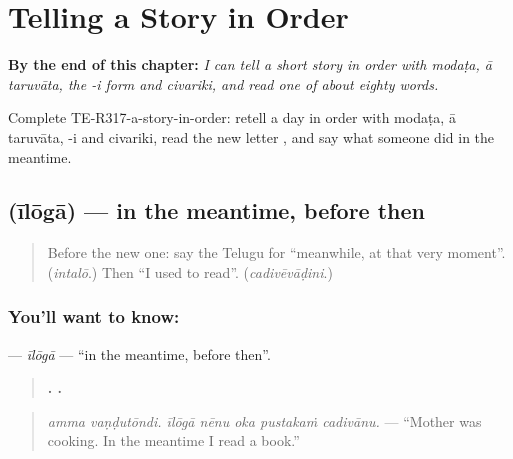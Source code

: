 
\chapter{Telling a Story in Order}
\label{ch:te-telling-a-story-in-order}

\begin{chapteropening}
\textbf{By the end of this chapter:} \emph{I can tell a short story in order with modaṭa, ā taruvāta, the -i form and civariki, and read one of about eighty words.}

Complete TE-R317-a-story-in-order: retell a day in order with modaṭa, ā taruvāta, -i and civariki, read the new letter , and say what someone did in the meantime.
\end{chapteropening}

\section[\texorpdfstring{\te{ఈలోగా} (īlōgā)}{ఈలోగా (īlōgā)}]{ (īlōgā) — in the meantime, before then}

\label{lesson:TE-C317-iloga}



\begin{quote}
Before the new one: say the Telugu for \textquotedblleft{}meanwhile, at that very moment\textquotedblright{}. (\emph{intalō}.) Then \textquotedblleft{}I used to read\textquotedblright{}. (\emph{cadivēvāḍini}.)
\end{quote}

\subsection*{You'll want to know: }
\textbf{} — \emph{īlōgā} — \textquotedblleft{}in the meantime, before then\textquotedblright{}.

\begin{quote}
\textbf{ .     .}
\end{quote}

\begin{quote}
\emph{amma vaṇḍutōndi. īlōgā nēnu oka pustakaṁ cadivānu.} — \textquotedblleft{}Mother was cooking. In the meantime I read a book.\textquotedblright{}
\end{quote}

